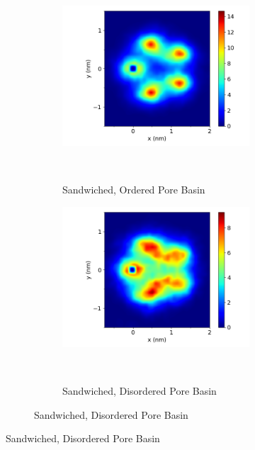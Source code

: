 \documentclass[journal=jpcbfk,manusciprt=article]{achemso}
\begin{document}
  \begin{figure}
  \begin{subfigure}{1\linewidth}
        \centering
        \begin{subfigure}{0.47\linewidth}
                \centering
                \includegraphics[width=\linewidth]{layered_xy_correlation.png}
                \caption{Sandwiched, Ordered Pore Basin}~\label{fig:sandwich_xy}
        \end{subfigure}
        \begin{subfigure}{0.47\linewidth}
                \centering
                \includegraphics[width=\linewidth]{disorder_xy_correlation.png}
                \caption{Sandwiched, Disordered Pore Basin}~\label{fig:disorder_sandwich_xy_correlation}

\end{subfigure}
\end{subfigure}
\end{figure}
\end{document}
